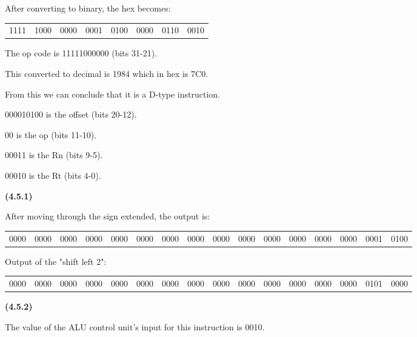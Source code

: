 \documentclass[11pt]{article}
\renewcommand\part[1]{\vspace{.10in}\textbf{(#1)}\par}
\begin{document}
	After converting to binary, the hex becomes: \par
	\begin{tabular}{c c c c c c c c}
		1111 & 1000 & 0000 & 0001 & 0100 & 0000 & 0110 & 0010
	\end{tabular}\par
	The op code is 11111000000 (bits 31-21).\par
	This converted to decimal is 1984 which in hex is 7C0.\par
	From this we can conclude that it is a D-type instruction.\par
	000010100 is the offset (bits 20-12).\par
	00 is the op (bits 11-10).\par
	00011 is the Rn (bits 9-5).\par
	00010 is the Rt (bits 4-0).\par
		
	\part{4.5.1}
		After moving through the sign extended, the output is:\par
		
		\begin{tabular}{c c c c c c c c c c c c c c c c}
			0000&0000&0000&0000&0000&0000&0000&0000&0000&0000&0000&0000&0000&0000&0001&0100
		\end{tabular}\par
		Output of the "shift left 2":\par
		\begin{tabular}{c c c c c c c c c c c c c c c c}
			0000&0000&0000&0000&0000&0000&0000&0000&0000&0000&0000&0000&0000&0000&0101&0000
		\end{tabular}\par
	
		
	\part{4.5.2}
		The value of the ALU control unit's input for this instruction is 0010.\par
		
\end{document}
